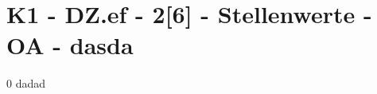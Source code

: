 \section{K1 - DZ.ef - 2[6] - Stellenwerte - OA - dasda}

\begin{langesbeispiel}\item[0] %
dadad

\end{langesbeispiel}